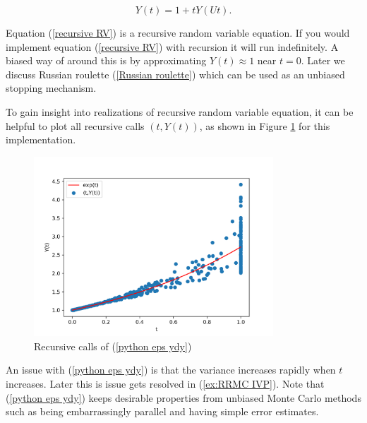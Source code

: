 \documentclass[a4paper,12pt]{article}
\begin{document}
\begin{equation}\label{recursive RV}
    Y(t) = 1 + tY(Ut).
\end{equation}

Equation (\ref{recursive RV}) is a recursive random variable equation. If you would implement equation
(\ref{recursive RV}) with recursion it will run indefinitely. A biased way of around this is by approximating
$Y(t) \approx 1$ near $t = 0$. Later we discuss Russian roulette (\ref{Russian roulette}) which
can be used as an unbiased stopping mechanism.

\vspace*{0.2cm}

\begin{pythonn} \label{python eps ydy}
    To gain insight into realizations of recursive random variable equation,
    it can be helpful to plot
    all recursive calls $(t,Y(t))$, as shown in Figure \ref{fig:intro example}
    for this implementation.

    \begin{figure}[h!]
        \centering
        \includegraphics[width=0.8\textwidth]{plots/intro example.png}
        \caption{Recursive calls of (\ref{python eps ydy})}
        \label{fig:intro example}
    \end{figure}
\end{pythonn}

An issue with (\ref{python eps ydy}) is that the variance increases rapidly when $t$ increases. Later
this is issue gets resolved in (\ref{ex:RRMC IVP}). Note that (\ref{python eps ydy}) keeps desirable properties
from unbiased Monte Carlo methods such as being embarrassingly parallel and
having simple error estimates.
\end{document}
